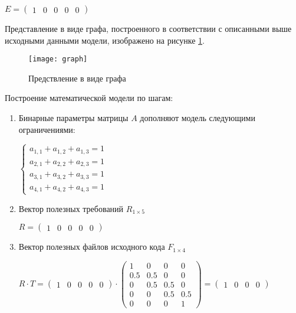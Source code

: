 \begin{center}
  $
  E = \begin{pmatrix}
    1 & 0 & 0 & 0 & 0
  \end{pmatrix}
  $
\end{center}

Представление в виде графа, построенного в соответствии с описанными выше исходными данными модели, изображено на рисунке \ref{fig:graph}.

\begin{figure}[H]
  \centering
  \texttt{[image: graph]}
  \caption{Предствление в виде графа}
  \label{fig:graph}
\end{figure}

Построение математической модели по шагам:
\begin{enumerate}
  \item Бинарные параметры матрицы $A$ дополняют модель следующими ограничениями:
  \begin{center}
    $
      \begin{cases}
        a_{1,1} + a_{1,2} + a_{1,3} = 1 \\ %
        a_{2,1} + a_{2,2} + a_{2,3} = 1 \\ %
        a_{3,1} + a_{3,2} + a_{3,3} = 1 \\ %
        a_{4,1} + a_{4,2} + a_{4,3} = 1 %
      \end{cases}
    $
  \end{center}
  \item Вектор полезных требований $R_{1 \times 5}$
  \begin{center}
    $
      R = 
      \begin{pmatrix}
        1 & 0 & 0 & 0 & 0
      \end{pmatrix}
    $
  \end{center}
  
  \item Вектор полезных файлов исходного кода $F_{1 \times 4}$
  \begin{center}
    $
      R \cdot T = 
      \begin{pmatrix}
        1 & 0 & 0 & 0 & 0
      \end{pmatrix}
      \cdot
      \begin{pmatrix}
        1 &   0 &   0 & 0   \\
      0.5 & 0.5 &   0 & 0   \\
        0 & 0.5 & 0.5 & 0   \\
        0 &   0 & 0.5 & 0.5 \\
        0 &   0 &   0 & 1 
    \end{pmatrix}
    = \begin{pmatrix}
        1 & 0 & 0 & 0
      \end{pmatrix}
    $
  \end{center}
  

\end{enumerate}
